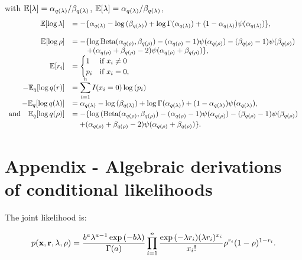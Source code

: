 \documentclass{article}[12pt]
\begin{document}
\noindent with 
${\mathbb E}[\lambda] = \alpha_{q(\lambda)}/\beta_{q(\lambda)}$,
${\mathbb E} [\lambda] = \alpha_{q(\lambda)}/\beta_{q(\lambda)}$,
$$
\begin{array}{rl}
{\mathbb E} [\log{\lambda}] & \displaystyle = -\{ \alpha_{q(\lambda)} - \log{(\beta_{q(\lambda)})} + \log{\Gamma(\alpha_{q(\lambda)})} + (1 - \alpha_{q(\lambda)}) \psi{(\alpha_{q(\lambda)})} \}, \\
 \\
{\mathbb E}[\log{\rho}] & \displaystyle = - \{ \log{\text{Beta}(\alpha_{q(\rho)}, \beta_{q(\rho)})} - (\alpha_{q(\rho)} - 1) \psi{(\alpha_{q(\rho)})} - (\beta_{q(\rho)} - 1)\psi{(\beta_{q(\rho)})} \\
    & \displaystyle \qquad + (\alpha_{q(\rho)} + \beta_{q(\rho)} - 2)\psi{(\alpha_{q(\rho)} + \beta_{q(\rho)})} \},
\\
{\mathbb E}[r_i] & \displaystyle = 
	\begin{cases}
	1 & \text{if } x_i \ne 0 \\
	p_i & \text{if } x_i = 0, \\
	\end{cases}
\\
-{\mathbb E}_q[\log{q(r)}] & \displaystyle = \sum_{i=1}^n I(x_i = 0) \log{(p_i)} \\ [0.5ex]
-{\mathbb E}_q[\log{q(\lambda)}] 
    & \displaystyle = \alpha_{q(\lambda)} - \log{(\beta_{q(\lambda)})} + \log{\Gamma{(\alpha_{q(\lambda)})}} + (1 - \alpha_{q(\lambda)}) \psi{(\alpha_{q(\lambda)})}, \\ [0.5ex]
 \mbox{and}\quad {\mathbb E}_q[\log{q(\rho)}] 
    & \displaystyle = - \{ \log{(\text{Beta}(\alpha_{q(\rho)}, \beta_{q(\rho)})} - (\alpha_{q(\rho)} - 1) \psi{(\alpha_{q(\rho)})} - (\beta_{q(\rho)} - 1)\psi{(\beta_{q(\rho)})}  \\ [0.5ex]
& \displaystyle \quad + (\alpha_{q(\rho)} + \beta_{q(\rho)} - 2)\psi{(\alpha_{q(\rho)} + \beta_{q(\rho)})} \}. \\ [0.5ex]
\end{array}
$$

\section{Appendix - Algebraic derivations of conditional likelihoods}

The joint likelihood is:

$$
p({\bf x}, {\bf r}, \lambda, \rho) = \frac{b^a \lambda^{a - 1} \exp{(-b \lambda)}}{\Gamma{(a)}} \prod_{i=1}^n \frac{\exp{(-\lambda r_i)} (\lambda r_i)^{x_i}}{x_i !} \rho^{r_i} (1 - \rho)^{1 - r_i}.
$$
\end{document}

